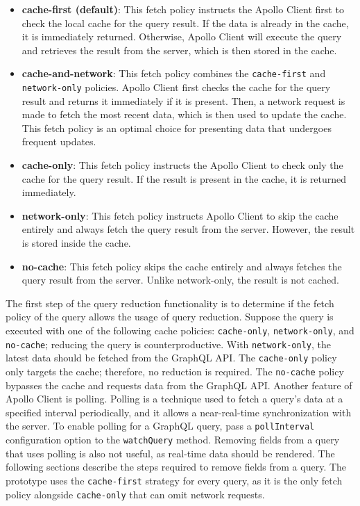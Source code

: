 \begin{itemize}
  \item \textbf{cache-first (default)}: This fetch policy instructs the Apollo Client first to check the local cache for the query result. If the data is already in the cache, it is immediately returned. Otherwise, Apollo Client will execute the query and retrieves the result from the server, which is then stored in the cache.
  \item \textbf{cache-and-network}: This fetch policy combines the \texttt{cache-first} and \texttt{network-only} policies. Apollo Client first checks the cache for the query result and returns it immediately if it is present. Then, a network request is made to fetch the most recent data, which is then used to update the cache. This fetch policy is an optimal choice for presenting data that undergoes frequent updates.
  \item \textbf{cache-only}: This fetch policy instructs the Apollo Client to check only the cache for the query result. If the result is present in the cache, it is returned immediately.
  \item \textbf{network-only}: This fetch policy instructs Apollo Client to skip the cache entirely and always fetch the query result from the server. However, the result is stored inside the cache.
  \item \textbf{no-cache}: This fetch policy skips the cache entirely and always fetches the query result from the server. Unlike network-only, the result is not cached.
\end{itemize}

\noindent The first step of the query reduction functionality is to determine if the fetch policy of the query allows the usage of query reduction. Suppose the query is executed with one of the following cache policies: \texttt{cache-only}, \texttt{network-only}, and \texttt{no-cache}; reducing the query is counterproductive. With \texttt{network-only}, the latest data should be fetched from the GraphQL \ac{API}. The \texttt{cache-only} policy only targets the cache; therefore, no reduction is required. The \texttt{no-cache} policy bypasses the cache and requests data from the GraphQL \ac{API}. Another feature of Apollo Client is polling. Polling is a technique used to fetch a query's data at a specified interval periodically, and it allows a near-real-time synchronization with the server. To enable polling for a GraphQL query, pass a \texttt{pollInterval} configuration option to the \texttt{watchQuery} method. Removing fields from a query that uses polling is also not useful, as real-time data should be rendered. The following sections describe the steps required to remove fields from a query. The prototype uses the \texttt{cache-first} strategy for every query, as it is the only fetch policy alongside \texttt{cache-only} that can omit network requests.

